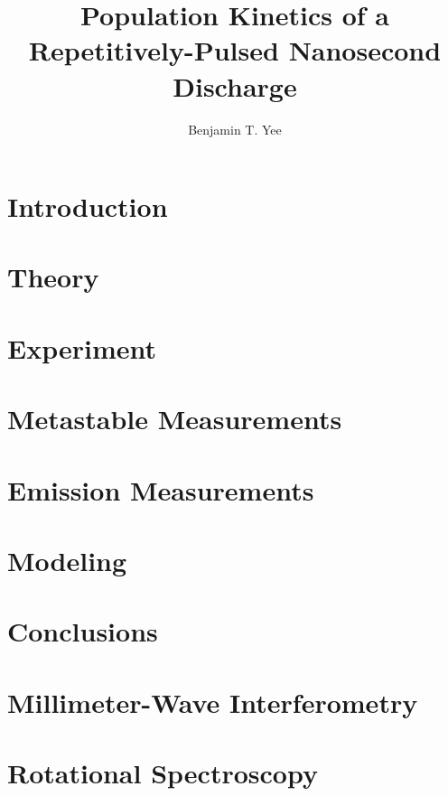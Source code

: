 \documentclass[12pt]{./tex/thesis-umich}
\title{Population Kinetics of a Repetitively-Pulsed Nanosecond Discharge}
\author{Benjamin T. Yee}
\begin{document}
  \chapter{Introduction}\label{chp:intro}
    
  
  \chapter{Theory}\label{chp:theory}
    

  \chapter{Experiment}\label{chp:exp}
    

  \chapter{Metastable Measurements}\label{chp:meta}
  
  \chapter{Emission Measurements}\label{chp:emit}

  \chapter{Modeling}\label{chp:model}

  \chapter{Conclusions}\label{chp:conc}

  \appendix
    \chapter{Millimeter-Wave Interferometry}\label{chp:mmw}
      
    \chapter{Rotational Spectroscopy}\label{chp:oes}
      

  
  
\end{document}
